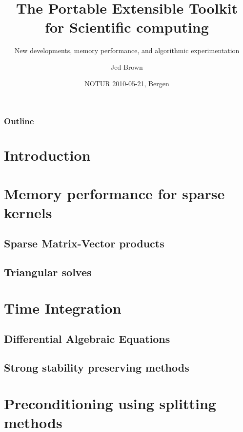 \documentclass{beamer}
\title[PETSc]{The Portable Extensible Toolkit for Scientific computing}
\subtitle{New developments, memory performance, and algorithmic experimentation}
\author{Jed Brown}
\institute[ETH Z\"urich]
{
  Laboratory of Hydrology, Hydraulics, and Glaciology \\
  ETH Z\"urich
}
\date{NOTUR 2010-05-21, Bergen}
\begin{document}
\lstset{language=C}
\normalem

\begin{frame}
\titlepage
\end{frame}

\begin{frame}
\frametitle{Outline}
\tableofcontents
\end{frame}

\section{Introduction}



\section[Memory]{Memory performance for sparse kernels}



%
\subsection{Sparse Matrix-Vector products}




\subsection{Triangular solves}



\section{Time Integration}
\subsection{Differential Algebraic Equations}



\subsection{Strong stability preserving methods}


\section{Preconditioning using splitting methods}


\end{document}
